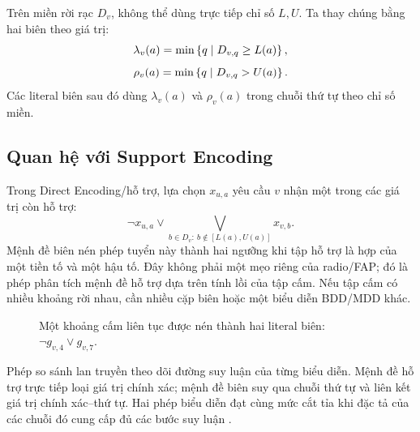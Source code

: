 Trên miền rời rạc \(D_v\), không thể dùng trực tiếp chỉ số \(L,U\). Ta thay
chúng bằng hai biên theo giá trị:
\[
  \lambda_v(a)=\min\left\{q\mid D_{v,q}\ge L(a)\right\},
\]
\[
  \rho_v(a)=\min\left\{q\mid D_{v,q}>U(a)\right\}.
\]
Các literal biên sau đó dùng \(\lambda_v(a)\) và \(\rho_v(a)\) trong chuỗi thứ
tự theo chỉ số miền.

\subsection{Quan hệ với Support Encoding}

Trong Direct Encoding/hỗ trợ, lựa chọn \(x_{u,a}\) yêu cầu \(v\) nhận một
trong các giá trị còn hỗ trợ:
\[
  \neg x_{u,a}
  \lor
  \bigvee_{b\in D_v:\ b\notin[L(a),U(a)]}x_{v,b}.
\]
Mệnh đề biên nén phép tuyển này thành hai ngưỡng khi tập hỗ trợ là hợp của một
tiền tố và một hậu tố. Đây không phải một mẹo riêng của radio/FAP; đó là phép
phân tích mệnh đề hỗ trợ dựa trên tính lồi của tập cấm. Nếu tập cấm có nhiều
khoảng rời nhau, cần nhiều cặp biên hoặc một
biểu diễn BDD/MDD khác.

\begin{figure}[tb]
\centering
{}
\caption{Một khoảng cấm liên tục được nén thành hai literal biên:
\(\neg g_{v,4}\lor g_{v,7}\).}
\label{fig:forbidden-interval-boundaries}
\end{figure}

Phép so sánh lan truyền theo dõi đường suy luận của từng biểu diễn. Mệnh đề hỗ
trợ trực tiếp loại giá trị chính xác; mệnh đề biên suy qua chuỗi thứ tự và liên
kết giá trị chính xác--thứ tự. Hai phép biểu diễn đạt cùng mức cắt tỉa khi đặc tả của các
chuỗi đó cung cấp đủ các bước suy luận
\parencite{gent2002arc,bacchus2007gac}.

